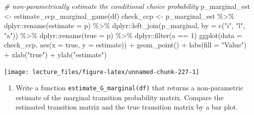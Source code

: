 \documentclass[
]{book}
\newenvironment{Shaded}{\begin{snugshade}}{\end{snugshade}}
\newcommand{\AttributeTok}[1]{\textcolor[rgb]{0.77,0.63,0.00}{#1}}
\newcommand{\CommentTok}[1]{\textcolor[rgb]{0.56,0.35,0.01}{\textit{#1}}}
\newcommand{\DecValTok}[1]{\textcolor[rgb]{0.00,0.00,0.81}{#1}}
\newcommand{\FunctionTok}[1]{\textcolor[rgb]{0.00,0.00,0.00}{#1}}
\newcommand{\NormalTok}[1]{#1}
\newcommand{\OtherTok}[1]{\textcolor[rgb]{0.56,0.35,0.01}{#1}}
\newcommand{\SpecialCharTok}[1]{\textcolor[rgb]{0.00,0.00,0.00}{#1}}
\newcommand{\StringTok}[1]{\textcolor[rgb]{0.31,0.60,0.02}{#1}}
\providecommand{\tightlist}{%
  \setlength{\itemsep}{0pt}\setlength{\parskip}{0pt}}
\begin{document}
\begin{Shaded}
\begin{Highlighting}[]
\CommentTok{\# non{-}parametrically estimate the conditional choice probability}
\NormalTok{p\_marginal\_est }\OtherTok{\textless{}{-}} \FunctionTok{estimate\_ccp\_marginal\_game}\NormalTok{(df)}
\NormalTok{check\_ccp }\OtherTok{\textless{}{-}}\NormalTok{ p\_marginal\_est }\SpecialCharTok{\%\textgreater{}\%}
\NormalTok{  dplyr}\SpecialCharTok{::}\FunctionTok{rename}\NormalTok{(}\AttributeTok{estimate =}\NormalTok{ p) }\SpecialCharTok{\%\textgreater{}\%}
\NormalTok{  dplyr}\SpecialCharTok{::}\FunctionTok{left\_join}\NormalTok{(p\_marginal, }\AttributeTok{by =} \FunctionTok{c}\NormalTok{(}\StringTok{"i"}\NormalTok{, }\StringTok{"l"}\NormalTok{, }\StringTok{"a"}\NormalTok{)) }\SpecialCharTok{\%\textgreater{}\%}
\NormalTok{  dplyr}\SpecialCharTok{::}\FunctionTok{rename}\NormalTok{(}\AttributeTok{true =}\NormalTok{ p) }\SpecialCharTok{\%\textgreater{}\%}
\NormalTok{  dplyr}\SpecialCharTok{::}\FunctionTok{filter}\NormalTok{(a }\SpecialCharTok{==} \DecValTok{1}\NormalTok{)}
\FunctionTok{ggplot}\NormalTok{(}\AttributeTok{data =}\NormalTok{ check\_ccp, }\FunctionTok{aes}\NormalTok{(}\AttributeTok{x =}\NormalTok{ true, }\AttributeTok{y =}\NormalTok{ estimate)) }\SpecialCharTok{+}
  \FunctionTok{geom\_point}\NormalTok{() }\SpecialCharTok{+}
  \FunctionTok{labs}\NormalTok{(}\AttributeTok{fill =} \StringTok{"Value"}\NormalTok{) }\SpecialCharTok{+} \FunctionTok{xlab}\NormalTok{(}\StringTok{"true"}\NormalTok{) }\SpecialCharTok{+} \FunctionTok{ylab}\NormalTok{(}\StringTok{"estimate"}\NormalTok{)}
\end{Highlighting}
\end{Shaded}

\begin{center}\texttt{[image: lecture\_files/figure-latex/unnamed-chunk-227-1]} \end{center}

\begin{enumerate}
\def\labelenumi{\arabic{enumi}.}
\setcounter{enumi}{14}
\tightlist
\item
  Write a function \texttt{estimate\_G\_marginal(df)} that returns a non-parametric estimate of the marginal transition probability matrix. Compare the estimated transition matrix and the true transition matrix by a bar plot.
\end{enumerate}
\end{document}
